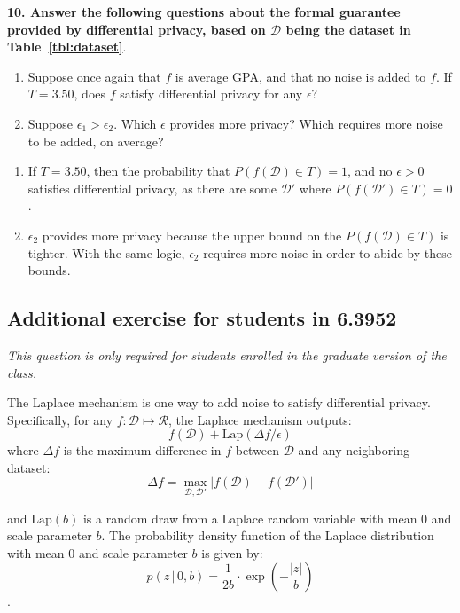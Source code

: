 \documentclass{article}
\begin{document}
\textbf{10. Answer the following questions about the formal guarantee provided by differential privacy, based on $\mathcal{D}$ being the dataset in Table~\ref{tbl:dataset}}.
\begin{enumerate}[label=\Alph*.]
\item Suppose once again that $f$ is average GPA, and that no noise is added to $f$. If $T = 3.50$, does $f$ satisfy differential privacy for any $\epsilon$?
\item Suppose $\epsilon_1 > \epsilon_2$. Which $\epsilon$ provides more privacy? Which requires more noise to be added, on average? 
\end{enumerate}

\bigskip
\begin{mdframed}
\begin{enumerate}[label=\Alph*.]
\item If $T= 3.50$, then the probability that $P(f(\mathcal{D}) \in T)=1$, and no $\epsilon >0$ satisfies differential privacy, as there are some $\mathcal{D'}$ where $P(f(\mathcal{D'}) \in T) = 0$.
\item $\epsilon_2$ provides more privacy because the upper bound on the $P(f(\mathcal{D}) \in T)$ is tighter. With the same logic, $\epsilon_2$ requires more noise in order to abide by these bounds.
\end{enumerate}
\end{mdframed}
\bigskip


\subsection*{Additional exercise for students in 6.3952}

\textit{This question is only required for students enrolled in the graduate version of the class.}

The Laplace mechanism is one way to add noise to satisfy differential privacy. Specifically, for any $f : \mathcal{D} \mapsto \mathcal{R}$, the Laplace mechanism outputs: $$f(\mathcal{D}) + \text{Lap}(\Delta f / \epsilon)$$ where $\Delta f$ is the maximum difference in $f$ between $\mathcal{D}$ and any neighboring dataset:
$$\Delta f = \max_{\mathcal{D}, \mathcal{D}'} |f(\mathcal{D}) - f(\mathcal{D}')|$$

and $\text{Lap}(b)$ is a random draw from a Laplace random variable with mean 0 and scale parameter $b$. The probability density function of the Laplace distribution with mean 0 and scale parameter $b$ is given by:
$$p(z \, | \, 0, b) = \frac{1}{2b} \cdot \exp \left(-\frac{|z|}{b}\right)$$.
\end{document}
